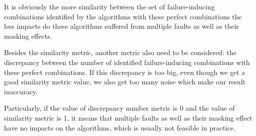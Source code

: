 \documentclass{sig-alternate}
\begin{document}
It is obviously the more similarity between the set of failure-inducing combinations identified by the algorithms with these perfect combinations the less impacts do these algorithms suffered from multiple faults as well as their masking effects.

Besides the similarity metric, another metric also need to be considered: the discrepancy between the number of identified failure-inducing combinations with these perfect combinations. If this discrepancy is too big, even though we get a good similarity metric value, we also get too many noise which make our result inaccuracy.

Particularly, if the value of discrepancy number metric is 0 and the value of similarity metric is 1, it means that multiple faults as well as their masking effect have no impacts on the algorithms, which is usually not feasible in practice.
\end{document}
